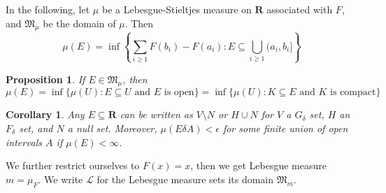 \documentclass[11pt]{article}
\theoremstyle{definition}
\theoremstyle{plain}
\newtheorem{cor}[thm]{Corollary}
\newtheorem{prop}[thm]{Proposition}
\newcommand{\R}{\mathbf{R}}
\begin{document}
In the following, let $\mu$ be a Lebesgue-Stieltjes measure on $\R$ associated with $F$, and $\mathfrak{M}_\mu$ be the domain of $\mu$. Then
\[\mu(E)=\inf\left\{\sum_{i\geq1}F(b_i)-F(a_i):E\subseteq\bigcup_{i\geq1}(a_i,b_i]\right\}\]

\begin{prop}
If $E\in\mathfrak{M}_\mu$, then
\[\mu(E)=\inf\{\mu(U):E\subseteq U\textrm{ and }E\textrm{ is open}\}=\inf\{\mu(U):K\subseteq E\textrm{ and }K\textrm{ is compact}\}\]
\end{prop}

\begin{cor}
Any $E\subseteq\R$ can be written as $V\setminus N$ or $H\cup N$ for $V$ a $G_\delta$ set, $H$ an $F_\delta$ set, and $N$ a null set. Moreover, $\mu(E\delta A)<\epsilon$ for some finite union of open intervals $A$ if $\mu(E)<\infty$.
\end{cor}

We further restrict ourselves to $F(x)=x$, then we get Lebesgue measure $m=\mu_F$. We write $\mathcal{L}$ for the Lebesgue measure sets its domain $\mathfrak{M}_m$.
\end{document}
